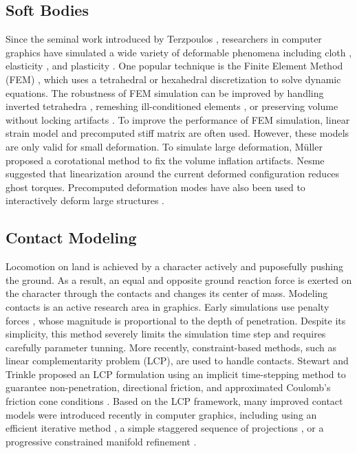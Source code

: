\subsection{Soft Bodies}
Since the seminal work introduced by Terzpoulos
\cite{Terzopoulos:1987}, researchers in computer graphics have
simulated a wide variety of deformable phenomena including cloth
\cite{Baraff:1998,Bridson:2002}, elasticity \cite{Muller:2002}, and
plasticity \cite{O'Brien:1999,Bargteil:2007}. One popular technique is
the Finite Element Method (FEM) \cite{Bathe:2007}, which uses a
tetrahedral or hexahedral discretization to solve dynamic
equations. The robustness of FEM simulation can be improved by
handling inverted tetrahedra \cite{Irving:2004}, remeshing
ill-conditioned elements \cite{Bargteil:2007}, or preserving volume
without locking artifacts \cite{Irving:2007}. To improve the
performance of FEM simulation, linear strain model and precomputed
stiff matrix are often used. However, these models are only valid for
small deformation. To simulate large deformation, M\"{u}ller \etal
\cite{Muller:2002} proposed a corotational method to fix the
volume inflation artifacts. Nesme \etal \cite{NPF05} suggested
that linearization around the current deformed configuration reduces
ghost torques. Precomputed deformation modes have also been used to
interactively deform large structures
\cite{James:2003,Barbic:2005,Kim:2009}.

\subsection{Contact Modeling}
Locomotion on land is achieved by a character actively and puposefully pushing the ground. As a result, an equal and opposite ground reaction force is exerted on the character through the contacts and changes its center of mass. Modeling contacts is an active research area in graphics. Early simulations use penalty forces \cite{}, whose magnitude is proportional to the depth of penetration. Despite its simplicity, this method severely limits the simulation time step and requires carefully parameter tunning. More recently, constraint-based methods, such as linear complementarity problem (LCP), are used to handle contacts. Stewart and Trinkle proposed an
LCP formulation using an implicit time-stepping method to guarantee
non-penetration, directional friction, and approximated Coulomb's
friction cone conditions \cite{Stewart:1996}. Based on the LCP
framework, many improved contact models were introduced recently in
computer graphics, including using an efficient iterative method
\cite{Erleben:2007}, a simple staggered sequence of projections
\cite{Kaufman:2008}, or a progressive constrained manifold
refinement \cite{Otaduy:2009}. 

